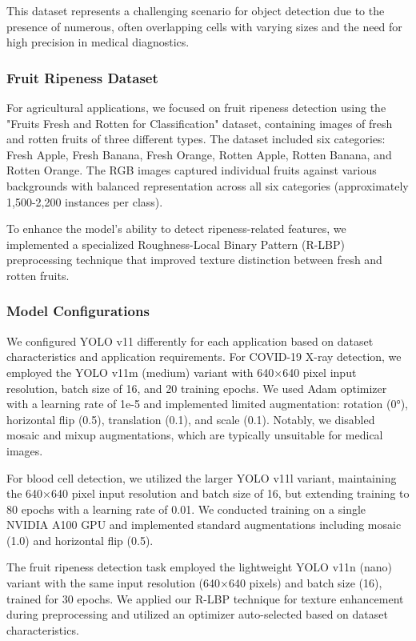 \begin{multicols}{2}
This dataset represents a challenging scenario for object detection due to the presence of numerous, often overlapping cells with varying sizes and the need for high precision in medical diagnostics.

\subsubsection{Fruit Ripeness Dataset}
For agricultural applications, we focused on fruit ripeness detection using the "Fruits Fresh and Rotten for Classification" dataset, containing images of fresh and rotten fruits of three different types. The dataset included six categories: Fresh Apple, Fresh Banana, Fresh Orange, Rotten Apple, Rotten Banana, and Rotten Orange. The RGB images captured individual fruits against various backgrounds with balanced representation across all six categories (approximately 1,500-2,200 instances per class).

To enhance the model's ability to detect ripeness-related features, we implemented a specialized Roughness-Local Binary Pattern (R-LBP) preprocessing technique that improved texture distinction between fresh and rotten fruits.

\subsubsection{Model Configurations}
We configured YOLO v11 differently for each application based on dataset characteristics and application requirements. For COVID-19 X-ray detection, we employed the YOLO v11m (medium) variant with 640×640 pixel input resolution, batch size of 16, and 20 training epochs. We used Adam optimizer with a learning rate of 1e-5 and implemented limited augmentation: rotation (0°), horizontal flip (0.5), translation (0.1), and scale (0.1). Notably, we disabled mosaic and mixup augmentations, which are typically unsuitable for medical images.

For blood cell detection, we utilized the larger YOLO v11l variant, maintaining the 640×640 pixel input resolution and batch size of 16, but extending training to 80 epochs with a learning rate of 0.01. We conducted training on a single NVIDIA A100 GPU and implemented standard augmentations including mosaic (1.0) and horizontal flip (0.5).

The fruit ripeness detection task employed the lightweight YOLO v11n (nano) variant with the same input resolution (640×640 pixels) and batch size (16), trained for 30 epochs. We applied our R-LBP technique for texture enhancement during preprocessing and utilized an optimizer auto-selected based on dataset characteristics.


\end{multicols}
